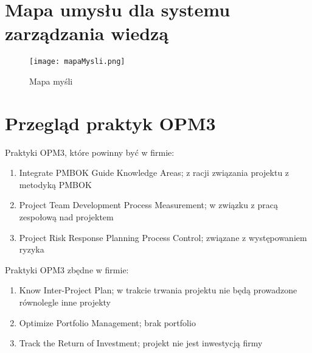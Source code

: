 
\section{Mapa umysłu dla systemu zarządzania wiedzą}

\begin{figure}[!h]
\centering
\texttt{[image: mapaMysli.png]}
\caption{Mapa myśli}
\label{fig:mapaMysli}
\end{figure}



\section{Przegląd praktyk OPM3}

Praktyki OPM3, które powinny być w firmie:

\begin{enumerate}
\item Integrate PMBOK Guide Knowledge Areas; z racji związania projektu z metodyką PMBOK
\item Project Team Development Process Measurement; w związku z pracą zespołową nad projektem
\item Project Risk Response Planning Process Control; związane z występowaniem ryzyka
\end{enumerate}

Praktyki OPM3 zbędne w firmie:

\begin{enumerate}
\item Know Inter-Project Plan; w trakcie trwania projektu nie będą prowadzone równolegle inne projekty
\item Optimize Portfolio Management; brak portfolio
\item Track the Return of Investment; projekt nie jest inwestycją firmy
\end{enumerate}

